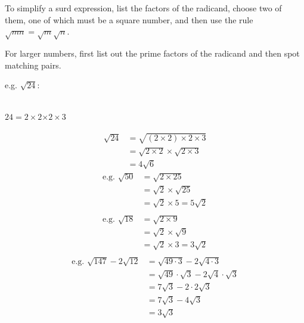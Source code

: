 \documentclass{article}
\begin{document}
\begin{enumerate}
To simplify a surd expression, list the factors of the radicand, choose two of them, one of which must be a square number, and then use the rule $\sqrt{mn}=\sqrt{m}\sqrt{n}$.

For larger numbers, first list out the prime factors of the radicand and then spot matching pairs.

e.g. $\sqrt{24}$:
\begin{center}
\\
$24=$\underline{$2\times2$}$\times2\times3$
\end{center}
\begin{align*}
\sqrt{24}&=\sqrt{(2\times2)\times2\times3}\\
&=\sqrt{2\times2}\times\sqrt{2\times3}\\
&=4\sqrt{6}
\end{align*}
\begin{align*}
\text{e.g. }
\sqrt{50}&=\sqrt{2\times25}\\
&=\sqrt{2}\times\sqrt{25}\\
&=\sqrt{2}\times5=5\sqrt{2}\\
\end{align*}
\begin{align*}
\text{e.g. }
\sqrt{18}
&=\sqrt{2 \times 9}\\
&=\sqrt{2} \times \sqrt{9}\\
&=\sqrt{2} \times 3=3\sqrt{2}\\
\end{align*}
\begin{align*}
\text{e.g. }
\sqrt{147}-2\sqrt{12}
&=\sqrt{49 \cdot 3}-2\sqrt{4 \cdot 3}\\
&=\sqrt{49} \cdot \sqrt{3}-2\sqrt{4} \cdot \sqrt{3}\\
&=7\sqrt{3}-2 \cdot 2\sqrt{3}\\
&=7\sqrt{3}-4\sqrt{3}\\
&=3\sqrt{3}
\end{align*}


\end{enumerate}
\end{document}
